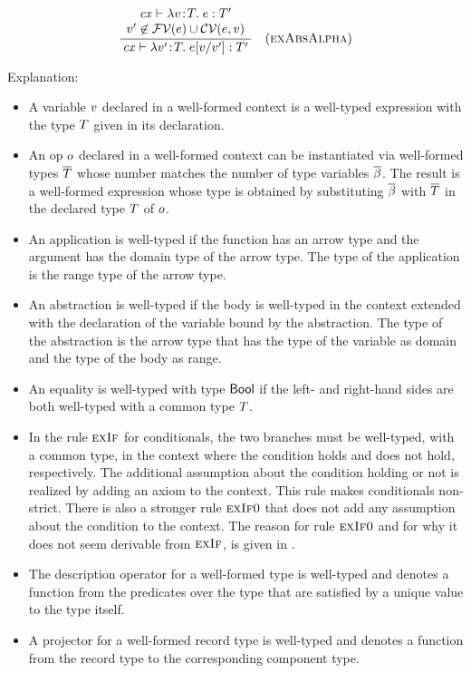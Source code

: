 \[
\frac{\begin{array}{c}\mathit{cx}\vdash\lambda v\!:\!T.\;e:T'\\v'\not\in\mathcal{FV}(e)\cup\mathcal{CV}(e,v)\end{array}}{\mathit{cx}\vdash\lambda v'\!:\!T.\;e[v/v']:T'}\quad\mbox{(\textsc{exAbsAlpha})}
\]

Explanation:
\begin{itemize}
\item
A variable $v$ declared in a well-formed context is a well-typed expression
with the type $T$ given in its declaration.
\item
An op $o$ declared in a well-formed context can be instantiated via
well-formed types $\overline{T}$ whose number matches the number of type variables
$\overline{\beta}$. The result is a well-formed expression whose type is obtained by
substituting $\overline{\beta}$ with $\overline{T}$ in the declared type $T$ of $o$.
\item
An application is well-typed if the function has an arrow type and the
argument has the domain type of the arrow type. The type of the application is
the range type of the arrow type.
\item
An abstraction is well-typed if the body is well-typed in the context extended
with the declaration of the variable bound by the abstraction. The type of the
abstraction is the arrow type that has the type of the variable as domain and
the type of the body as range.
\item
An equality is well-typed with type $\mathsf{Bool}$ if the left- and right-hand sides
are both well-typed with a common type $T$.
\item
In the rule $\textsc{exIf}$ for conditionals, the two branches must be well-typed,
with a common type, in the context where the condition holds and does not
hold, respectively. The additional assumption about the condition holding or
not is realized by adding an axiom to the context. This rule makes
conditionals non-strict. There is also a stronger rule $\textsc{exIf0}$ that does not
add any assumption about the condition to the context. The reason for rule
$\textsc{exIf0}$ and for why it does not seem derivable from $\textsc{exIf}$, is given in
.
\item
The description operator for a well-formed type is well-typed and denotes a
function from the predicates over the type that are satisfied by a unique
value to the type itself.
\item
A projector for a well-formed record type is well-typed and denotes a function
from the record type to the corresponding component type.

\end{itemize}

